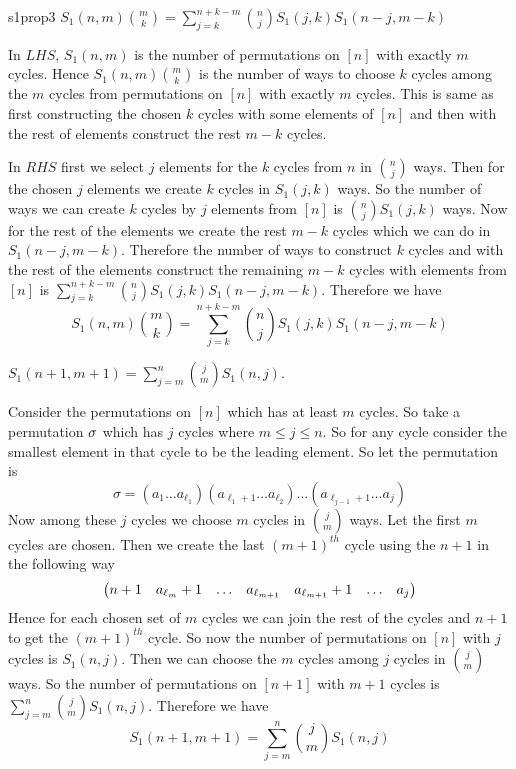 \begin{lemma}{}{s1prop3}
	$S_1(n,m)\displaystyle\binom{m}{k}=\sum_{j=k}^{n+k-m}\binom{n}{j}S_1(j,k)S_1(n-j,m-k)$
\end{lemma}
\begin{combi-proof}
	In $LHS$, $S_1(n,m)$ is the number of permutations on $[n]$ with exactly $m$ cycles. Hence $S_1(n,m)\binom{m}{k}$ is the number of ways to choose $k$ cycles among the $m$ cycles from permutations on $[n]$ with exactly $m$ cycles. This is same as first constructing the chosen $k$ cycles with some elements of $[n]$ and then with the rest of elements construct the rest $m-k$ cycles.
	
	In $RHS$ first we select  $j$ elements for the $k$ cycles from $n$ in $\binom{n}{j}$ ways. Then for the chosen $j$ elements we create $k$ cycles in $S_1(j,k)$ ways. So the number of ways we can create $k$ cycles by $j$ elements from $[n]$ is $\binom{n}{j}S_1(j,k)$ ways. Now for the rest of the elements we create the rest $m-k$ cycles which we can do in $S_1(n-j,m-k)$. Therefore the number of ways to construct $k$ cycles and with the rest of the elements construct the remaining $m-k$ cycles with elements from $[n]$ is $\sum\limits_{j=k}^{n+k-m}\binom{n}{j}S_1(j,k)S_1(n-j,m-k)$. Therefore we have $$S_1(n,m)\displaystyle\binom{m}{k}=\sum_{j=k}^{n+k-m}\binom{n}{j}S_1(j,k)S_1(n-j,m-k)$$
\end{combi-proof}
\begin{Theorem}{}{}
	$S_1(n+1,m+1)=\displaystyle\sum_{j=m}^n\binom{j}{m}S_1(n,j)$.
\end{Theorem}
\begin{combi-proof}
Consider the permutations on $[n]$ which has at least $m$ cycles. So take a permutation $\sigma$ which has $j$ cycles where $m\leq j\leq n$. So for any cycle consider the smallest element in that cycle to be the leading element. So let the permutation is $$\sigma=(a_1\ldots a_{\ell_1})(a_{\ell_1+1}\ldots a_{\ell_2})\ldots(a_{\ell_{j-1}+1}\ldots a_j)$$Now among these $j$ cycles we choose $m$ cycles in $\binom{j}{m}$ ways. Let the first $m$ cycles are chosen. Then we create the last $(m+1)^{th}$ cycle using the $n+1$ in the following way $$\left(\begin{matrix}n+1 & a_{\ell_{m}}+1& \dots& a_{\ell_{m+1}}&a_{\ell_{m+1}}+1&\dots&a_j\end{matrix}\right)$$Hence for each chosen set of $m$ cycles we can join the rest of the cycles and $n+1$ to get the $(m+1)^{th}$ cycle. So now the number of permutations on $[n]$ with $j$ cycles is $S_1(n,j)$. Then we can choose the $m$ cycles among $j$ cycles in $\binom{j}{m}$ ways. So the number of permutations on $[n+1]$ with $m+1$ cycles is $\sum\limits_{j=m}^n\binom{j}{m}S_1(n,j)$. Therefore we have $$S_1(n+1,m+1)=\displaystyle\sum_{j=m}^n\binom{j}{m}S_1(n,j)$$
\end{combi-proof}
